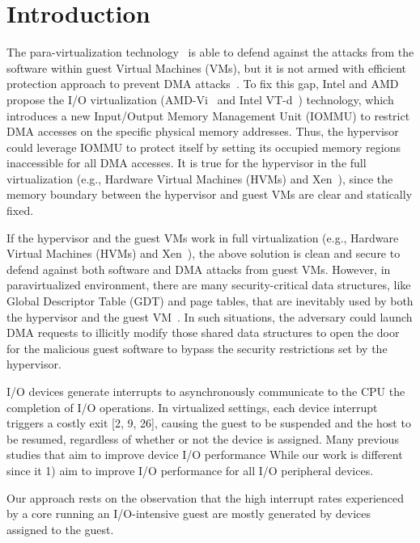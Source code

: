 \section{Introduction} \label{sec:intro}
The para-virtualization technology~\cite{XEN-SOPS03,denali-paravirtualization} is able to defend against the attacks from the software within guest Virtual Machines (VMs), but it is not armed with efficient protection approach to prevent DMA attacks~\cite{disaggregation}. To fix this gap, Intel and AMD propose the I/O virtualization (AMD-Vi~\cite{amdvt} and Intel VT-d~\cite{intelvt}) technology, which introduces a new Input/Output Memory Management Unit (IOMMU) to restrict DMA accesses on the specific physical memory addresses. Thus, the hypervisor could leverage IOMMU to protect itself by setting its occupied memory regions inaccessible for all DMA accesses. It is true for the hypervisor in the full virtualization (e.g., Hardware Virtual Machines (HVMs) and Xen~\cite{XEN-SOPS03}), since the memory boundary between the hypervisor and guest VMs are clear and statically fixed.


If the hypervisor and the guest VMs work in full virtualization (e.g., Hardware Virtual Machines (HVMs) and Xen~\cite{XEN-SOPS03}), the above solution is clean and secure to defend against both software and DMA attacks from guest VMs. However, in paravirtualized environment, there are many security-critical data structures, like Global Descriptor Table (GDT) and page tables, that are inevitably used by both the hypervisor and the guest VM~\cite{A novel hardware assisted full virtualization technique?, I remeber one paper discussing about this}. In such situations, the adversary could launch DMA requests to illicitly modify those shared data structures to open the door for the malicious guest software to bypass the security restrictions set by the hypervisor.

I/O devices generate interrupts to asynchronously communicate
to the CPU the completion of I/O operations. In virtualized settings,
each device interrupt triggers a costly exit [2, 9, 26], causing the
guest to be suspended and the host to be resumed, regardless of
whether or not the device is assigned.
Many previous studies that aim to improve device I/O performance 
While our work is different since it 1) aim to improve I/O performance for all I/O peripheral devices.

Our approach rests on the observation that the high interrupt
rates experienced by a core running an I/O-intensive guest are
mostly generated by devices assigned to the guest.

